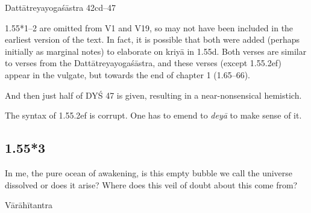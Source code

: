\begin{ekdosis}
\begin{sources}[hp01_055_1]
Dattātreyayogaśāstra 42cd--47

\begin{versinnote}
\end{versinnote}

\end{sources}

\begin{testimonia}[hp01_055_1]
\end{testimonia}

\begin{philcomm}[hp01_055_1]
1.55*1–2 are omitted from V1 and V19, so may not have been included in the earliest version of the text. In fact, it is possible that both were added (perhaps initially as marginal notes) to elaborate on kriyā in 1.55d. Both verses are similar to verses from the Dattātreyayogaśāstra, and these verses (except 1.55.2ef) appear in the vulgate, but towards the end of chapter 1 (1.65–66).

And then just half of DYŚ 47 is given, resulting in a near-nonsensical hemistich.

The syntax of 1.55.2ef is corrupt. One has to emend to \emph{deyā} to make sense of it.
\end{philcomm}

\subsection*{1.55*3}
\begin{translation}[hp01_055_3]
In me, the pure ocean of awakening, is this empty bubble we call the universe dissolved or does it arise? Where does this veil of doubt about this come from?
\end{translation}

\begin{testimonia}[hp01_055_3]
Vārāhītantra

\begin{versinnote}
\end{versinnote}


\end{testimonia}
\end{ekdosis}
